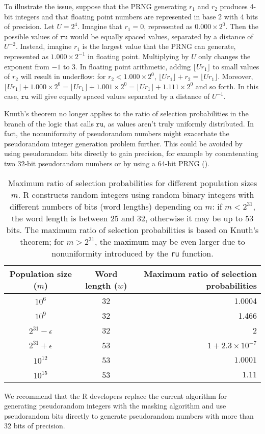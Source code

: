 \documentclass[12pt]{article}
\begin{document}
To illustrate the issue, suppose that the PRNG generating $r_1$ and $r_2$ produces 4-bit integers and that floating point numbers 
are represented in base 2 with 4 bits of precision.
Let $U=2^4$.
Imagine that $r_1 = 0$, represented as $0.000 \times 2^0$.
Then the possible values of $\texttt{ru}$ would be equally spaced values, separated by a distance of $U^{-2}$.
Instead, imagine $r_1$ is the largest value that the PRNG can generate,
represented as $1.000 \times 2^{-1}$ in floating point.
Multiplying by $U$ only changes the exponent from $-1$ to $3$.
In floating point arithmetic, adding $\lfloor U r_1 \rfloor$ to small values of $r_2$ will result in underflow:
for $r_2 < 1.000 \times 2^{0}$, $\lfloor U r_1 \rfloor + r_2 = \lfloor U r_1 \rfloor$. 
Moreover, $\lfloor U r_1 \rfloor + 1.000 \times 2^{0} = \lfloor U r_1 \rfloor + 1.001 \times 2^{0} = \lfloor U r_1 \rfloor + 1.111 \times 2^{0}$ and so forth.
In this case, $\texttt{ru}$ will give equally spaced values separated by a distance of $ U^{-1}$.

Knuth's theorem no longer applies to the ratio of selection probabilities in the branch of the logic that calls $\texttt{ru}$, as values aren't truly uniformly distributed.
In fact, the nonuniformity of pseudorandom numbers might exacerbate the pseudorandom integer generation problem further.
This could be avoided by using pseudorandom bits directly to gain precision, for example by
concatenating two 32-bit pseudorandom numbers or by using a 64-bit PRNG (\cite{marsaglia_64bit_2004}).

\begin{table}[h]
\caption{Maximum ratio of selection probabilities for different population sizes $m$. 
R constructs random integers using random binary integers with different numbers of bits (word lengths) depending on $m$:
if $m < 2^{31}$, the word length is between $25$ and $32$, otherwise it may be up to $53$ bits.
The maximum ratio of selection probabilities is based on Knuth's theorem; 
for $m > 2^{31}$, the maximum may be even larger due to nonuniformity introduced by the \texttt{ru} function.
}
\begin{center}
\begin{tabular}{|c|c|r|}

\hline
Population size ($m$) & Word length ($w$) & Maximum ratio of selection probabilities\\
\hline 
$10^6$ & 32 & 1.0004 \\
$10^9$ & 32 & 1.466 \\
 $2^{31}-\epsilon$ & 32 & 2 \\
$2^{31}+\epsilon$ & 53 & $1 + 2.3 \times 10^{-7}$ \\
$10^{12}$ & 53 & $1.0001$ \\
$10^{15}$ & 53 & $1.11$ \\
\hline

\end{tabular}
\end{center}
\label{tab}
\end{table}%

We recommend that the R developers replace the current algorithm for generating pseudorandom integers with the masking algorithm
and use pseudorandom bits directly to generate pseudorandom numbers with more than 32 bits of precision.



\end{document}
